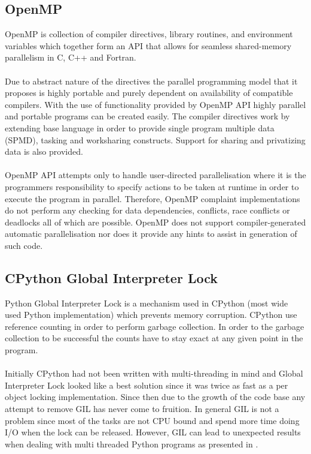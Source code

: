 \documentclass[12pt, a4paper]{report}
\begin{document}
\subsection{OpenMP}\label{subsec:openmp}
OpenMP\cite{OpenMP3.1} is collection of compiler directives, library routines, and environment variables
which together form an API that allows for seamless shared-memory parallelism
in C, C++ and Fortran.
\\\\
Due to abstract nature of the directives the parallel programming model that it proposes
is highly portable and purely dependent on availability of compatible compilers.
With the use of functionality provided by OpenMP API highly parallel and portable programs
can be created easily. The compiler directives work by extending base language in
order to provide single program multiple data (SPMD), tasking and worksharing constructs.
Support for sharing and privatizing data is also provided.
\\\\
OpenMP API attempts only to handle user-directed parallelisation where it is the programmers
responsibility to specify actions to be taken at runtime in order to execute the program
in parallel. Therefore, OpenMP complaint implementations do not perform any checking for
data dependencies, conflicts, race conflicts or deadlocks all of which are possible.
OpenMP does not support compiler-generated automatic parallelisation nor does it provide
any hints to assist in generation of such code.

\subsection{CPython Global Interpreter Lock}\label{subsec:gil}
Python Global Interpreter Lock is a mechanism used in CPython (most wide used Python implementation)
which prevents memory corruption. CPython use reference counting in order to perform garbage collection.
In order to the garbage collection to be successful the counts have to stay exact at any given point
in the program.
\\\\
Initially CPython had not been written with multi-threading in mind and Global Interpreter Lock
looked like a best solution since it was twice as fast as a per object locking implementation.
Since then due to the growth of the code base any attempt to remove GIL has never come to fruition.
In general GIL is not a problem since most of the tasks are not CPU bound and spend more time doing
I/O when the lock can be released. However, GIL can lead to unexpected results when dealing with
multi threaded Python programs as presented in \cite{UnderstandingGIL}.
\end{document}
